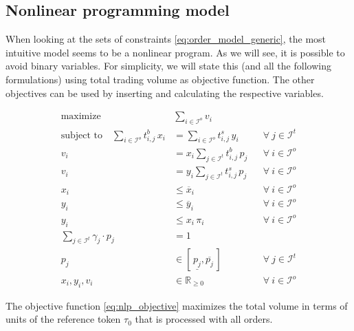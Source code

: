 \documentclass[11pt,parskip=full]{scrartcl}%
\newcommand*{\itokens}{\mathcal{I}^t}       %
\newcommand*{\iorders}{\mathcal{I}^o}       %
\begin{document}
\newpage
\subsection{Nonlinear programming model}
\label{subsec:NLPmodel}

When looking at the sets of constraints \eqref{eq:order_model_generic}, the most intuitive model seems to be a nonlinear program.
As we will see, it is possible to avoid binary variables.
For simplicity, we will state this (and all the following formulations) using total trading volume as objective function.
The other objectives can be used by inserting and calculating the respective variables.

\begin{subequations}
\begin{align}
  \text{maximize} \quad & \sum\limits_{i \in \iorders} v_i
  \label{eq:nlp_objective}
  \\[2mm]
  \text{subject to} \quad
  \sum\limits_{i \in \iorders} t^b_{i,j} \, x_i
  &= \sum\limits_{i \in \iorders} t^s_{i,j} \, y_i
  && \forall \> j \in \itokens
  \label{eq:nlp_tokenbalance}
  \\[2mm]
  v_i
  &= x_i \sum\limits_{j \in \itokens} t^b_{i,j} \, p_j
  && \forall \> i \in \iorders
  \label{eq:nlp_buyvolume}
  \\[1mm]
  v_i
  &= y_i \sum\limits_{j \in \itokens} t^s_{i,j} \, p_j
  && \forall \> i \in \iorders
  \label{eq:nlp_sellvolume}
  \\[2mm]
  x_i &\le \overline{x}_i
  && \forall \> i \in \iorders
  \label{eq:nlp_limit_x}
  \\[1mm]
  y_i &\le \overline{y}_i
  && \forall \> i \in \iorders
  \label{eq:nlp_limit_y}
  \\[1mm]
  y_i &\le x_i \, \pi_i
  && \forall \> i \in \iorders
  \label{eq:nlp_limit_pi}
  \\[2mm]
  \sum\limits_{j \in \itokens} \gamma_j \cdot p_j
  &= 1
  \label{eq:nlp_reftoken}
  \\[1mm]
  p_j
  &\in [\,\underline{p_j},\overline{p_j}\,]
  && \forall \> j \in \itokens
  \\[1mm]
  x_i, y_i, v_i &\in \mathbb{R}_{\ge 0}
  && \forall \> i \in \iorders
\end{align}
\label{eq:nlp}
\end{subequations}

The objective function \eqref{eq:nlp_objective} maximizes the total volume in terms of units of
the reference token $ \tau_0 $ that is processed with all orders.
\end{document}
